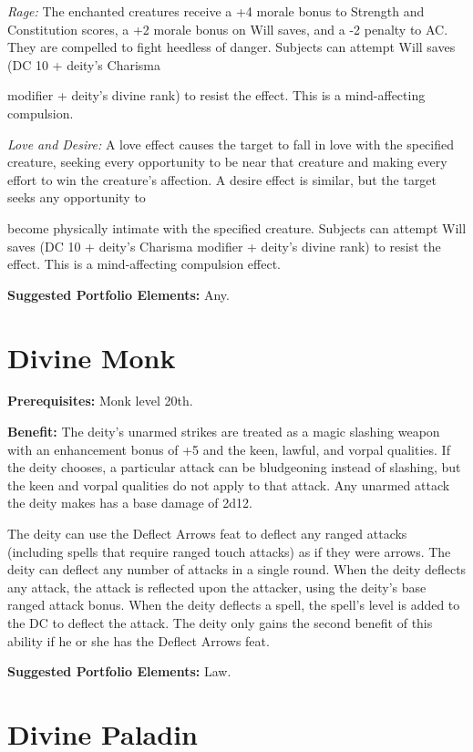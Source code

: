 \documentclass{article}
\begin{document}
\textit{Rage: }The enchanted creatures receive a +4 morale bonus to Strength and 
Constitution scores, a +2 morale bonus on Will saves, and a -2 penalty to AC. They 
are compelled to fight heedless of danger. Subjects can attempt Will saves (DC 
10 + deity's Charisma

modifier + deity's divine rank) to resist the effect. This is a mind-affecting 
compulsion.

\textit{Love and Desire: }A love effect causes the target to fall in love with 
the specified creature, seeking every opportunity to be near that creature and 
making every effort to win the creature's affection. A desire effect is similar, 
but the target seeks any opportunity to

become physically intimate with the specified creature. Subjects can attempt Will 
saves (DC 10 + deity's Charisma modifier + deity's divine rank) to resist the effect. 
This is a mind-affecting compulsion effect.

\textbf{Suggested Portfolio Elements:} Any.

\vspace{12pt}
\section*{Divine Monk}

\textbf{Prerequisites:} Monk level 20th.

\textbf{Benefit:} The deity's unarmed strikes are treated as a magic slashing weapon 
with an enhancement bonus of +5 and the keen, lawful, and vorpal qualities. If 
the deity chooses, a particular attack can be bludgeoning instead of slashing, 
but the keen and vorpal qualities do not apply to that attack. Any unarmed attack 
the deity makes has a base damage of 2d12.

The deity can use the Deflect Arrows feat to deflect any ranged attacks (including 
spells that require ranged touch attacks) as if they were arrows. The deity can 
deflect any number of attacks in a single round. When the deity deflects any attack, 
the attack is reflected upon the attacker, using the deity's base ranged attack 
bonus. When the deity deflects a spell, the spell's level is added to the DC to 
deflect the attack.  The deity only gains the second benefit of this ability if 
he or she has the Deflect Arrows feat.

\textbf{Suggested Portfolio Elements:} Law.

\vspace{12pt}
\section*{Divine Paladin}
\end{document}
